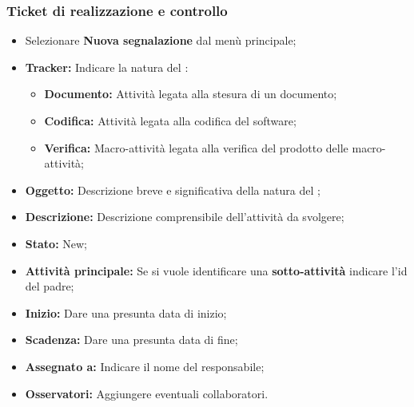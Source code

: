       \subsubsection{Ticket di realizzazione e controllo}
        \begin{itemize}
          \item Selezionare \textbf{Nuova segnalazione} dal menù principale;
          \item \textbf{Tracker: }Indicare la natura del :
          \bgroup
            \begin{itemize}
              \item \textbf{Documento: }Attività legata alla stesura di un documento;
              \item \textbf{Codifica: }Attività legata alla  codifica del software;
              \item \textbf{Verifica: }Macro-attività legata alla verifica del prodotto delle macro-attività;
            \end{itemize}
          \egroup
            \item \textbf{Oggetto: }Descrizione breve e significativa della natura del ;
          \item \textbf{Descrizione: }Descrizione comprensibile dell'attività da svolgere;
          \item \textbf{Stato: }New;
          \item \textbf{Attività principale: }Se si vuole identificare una \textbf{sotto-attività} indicare l'id del  padre;
          \item \textbf{Inizio: }Dare una presunta data di inizio;
          \item \textbf{Scadenza: }Dare una presunta data di fine;
          \item \textbf{Assegnato a: }Indicare il nome del responsabile;
          \item \textbf{Osservatori: }Aggiungere eventuali collaboratori.
        \end{itemize}
